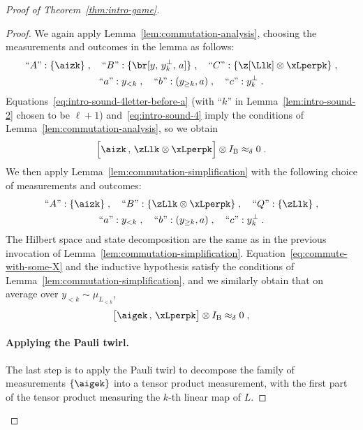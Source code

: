 \documentclass[11pt]{article}
\theoremstyle{definition}
\newcommand{\Id}{\ensuremath{I}}
\newcommand{\ib}{\Id_\bob}
\newcommand{\labelstyle}[1]{\ensuremath{\textsc{#1}}\xspace}
\newcommand{\bob}{\labelstyle{B}}
\begin{document}
\begin{proof}[Proof of Theorem~\ref{thm:intro-game}]
\begin{proof}
    We again apply Lemma~\ref{lem:commutation-analysis}, choosing the
    measurements and outcomes in the lemma as follows:
    \begin{gather*}
      \text{``$A$''}: \{\aizk\}\;,\quad
      \text{``$B$''}: \{ \br[y,\, y^\perp_k,\, a] \}\;,\quad
      \text{``$C$''}: \{ \z[\Llk] \otimes \xLperpk \}\;, \\
      \text{``$a$''}: y_{< k} \;, \quad
      \text{``$b$''}: (y_{\geq k},a) \;, \quad
      \text{``$c$''}: y_k^\perp \;.
    \end{gather*}
    Equations~\eqref{eq:intro-sound-4letter-before-a} (with ``$k$'' in
    Lemma~\ref{lem:intro-sound-2} chosen to be $\ell+1$)
    and~\eqref{eq:intro-sound-4} imply the conditions of
    Lemma~\ref{lem:commutation-analysis}, so we obtain
    \begin{equation}\label{eq:commute-with-some-X}
      \Bigl[ \aizk \,,\,  \zLlk \otimes \xLperpk \Bigr] \otimes
      \ib \approx_\delta 0\;.
    \end{equation}
    We then apply Lemma~\ref{lem:commutation-simplification} with the following
    choice of measurements and outcomes:
    \begin{gather*}
      \text{``$A$''}: \{\aizk\}\;,\quad
      \text{``$B$''}: \{\zLlk \otimes \xLperpk \}\;, \quad
      \text{``$Q$''}: \{\zLlk \}\;, \\
      \text{``$a$''}: y_{< k} \;, \quad
      \text{``$b$''}: (y_{\geq k},a) \;, \quad
      \text{``$c$''}: y_k^\perp \;.
    \end{gather*}
    The Hilbert space and state decomposition are the same as in the previous
    invocation of Lemma~\ref{lem:commutation-simplification}.
    Equation~\eqref{eq:commute-with-some-X} and the inductive hypothesis satisfy
    the conditions of Lemma~\ref{lem:commutation-simplification}, and we
    similarly obtain that on average over $y_{< k} \sim \mu_{L_{<k}}$,
    \begin{equation}
      \label{eq:intro-sound-6}
      \bigl[ \aigek \,,\, \xLperpk \bigr] \otimes \ib
      \approx_\delta 0\;,
    \end{equation}

    \paragraph{Applying the Pauli twirl.}
    The last step is to apply the Pauli twirl to decompose the family of
    measurements $\{\aigek \}$ into a tensor product measurement, with the first
    part of the tensor product measuring the $k$-th linear map of $L$.


\end{proof}
\end{proof}
\end{document}
